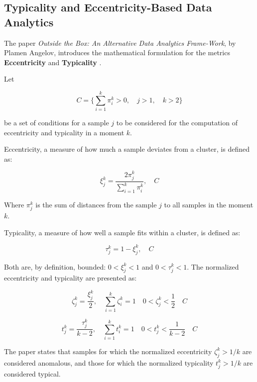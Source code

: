 \documentclass[a4paper]{article}
\begin{document}
\subsection{Typicality and Eccentricity-Based Data Analytics}

The paper \textit{Outside the Box: An Alternative Data Analytics Frame-Work}, by Plamen Angelov, introduces the mathematical formulation for the metrics \textbf{Eccentricity} and \textbf{Typicality} \cite{angelov2014outside}.

Let

\begin{equation}
    C = \{ \sum_{i=1}^{k} \pi^k_i > 0,\quad j > 1,\quad k > 2 \}
\end{equation}

be a set of conditions for a sample $j$ to be considered for the computation of eccentricity and typicality in a moment $k$.

Eccentricity, a measure of how much a sample deviates from a cluster, is defined as:

\begin{equation}
    \xi^k_j = \frac{2\pi^k_j}{\sum_{i=1}^{k} \pi^k_i}, \quad C
\end{equation}

Where $\pi^k_j$ is the sum of distances from the sample $j$ to all samples in the moment $k$.

Typicality, a measure of how well a sample fits within a cluster, is defined as:

\begin{equation}
    \tau^k_j = 1 - \xi^k_j, \quad C
\end{equation}

Both are, by definition, bounded: $0 < \xi^k_j < 1$ and $0 < \tau^k_j < 1$. The normalized eccentricity and typicality are presented as:

\begin{equation}
    \zeta^k_j = \frac{\xi^k_j}{2}, \quad \sum_{i=1}^{k} \zeta^k_i = 1\quad 0 < \zeta^k_j < \frac{1}{2}\quad C
\end{equation}

\begin{equation}
    t^k_j = \frac{\tau^k_j}{k - 2}, \quad \sum_{i=1}^{k} t^k_i = 1\quad 0 < t^k_j < \frac{1}{k - 2}\quad C
\end{equation}

The paper states that samples for which the normalized eccentricity $\zeta^k_j > 1/k$ are considered anomalous, and those for which the normalized typicality $t^k_j > 1/k$ are considered typical.
\end{document}
